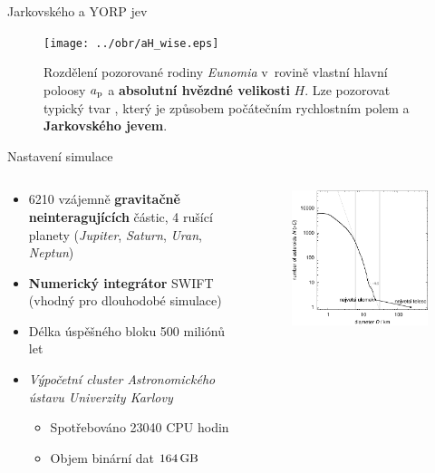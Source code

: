 \documentclass[xcolor=dvipsnames]{beamer}
\begin{document}
\begin{frame}[t]{\secname}{Jarkovského a YORP jev}
	\begin{figure}
		\centering
		\texttt{[image: ../obr/aH\_wise.eps]}
		\caption{\footnotesize{Rozdělení pozorované rodiny \textit{Eunomia} v~rovině vlastní hlavní poloosy $a_{\rm p}$ a \textbf{absolutní hvězdné velikosti} $H$. Lze pozorovat typický tvar , který je způsobem počátečním rychlostním polem a \textbf{Jarkovského jevem}.}}
	\end{figure}
\end{frame}


\begin{frame}[t]{\secname}{Nastavení simulace}
	\begin{columns}
	\begin{column}{0.6\textwidth}
		\begin{itemize}
			\item 6210 vzájemně \textbf{gravitačně neinteragujících} částic, 4 rušící planety (\textit{Jupiter}, \textit{Saturn}, \textit{Uran}, \textit{Neptun})
			\item \textbf{Numerický integrátor} SWIFT (vhodný pro dlouhodobé simulace)
			\item Délka úspěšného bloku 500 miliónů let
			\item \textit{Výpočetní cluster Astronomického ústavu Univerzity Karlovy}
			\begin{itemize}
				\item Spotřebováno 23040 CPU hodin
				\item Objem binární dat $164\,{\rm GB}$ 
			\end{itemize}
		\end{itemize}
	\end{column}
	\begin{column}{0.4\textwidth}
		\begin{figure}
			\centering
			\includegraphics[width=1\textwidth]{../obr/size_distribution-crop}

\end{figure}
\end{column}
\end{columns}
\end{frame}
\end{document}

